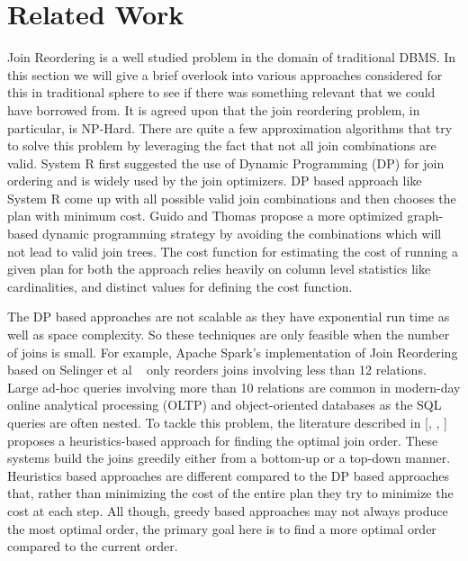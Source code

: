 \section{Related Work}\label{sec:rel_work}
Join Reordering is a well studied problem in the domain of traditional DBMS. In this section we will give a brief overlook into various approaches considered for this in traditional sphere to see if there was something relevant that we could have borrowed from. It is agreed upon that the join reordering problem, in particular, is NP-Hard. There are quite a few approximation algorithms that try to solve this problem by leveraging the fact that not all join combinations are valid. System R \cite{b1} first suggested the use of Dynamic Programming (DP) for join ordering and is widely used by the join optimizers. DP based approach like System R come up with all possible valid join combinations and then chooses the plan with minimum cost. Guido and Thomas \cite{b3} propose a more optimized graph-based dynamic programming strategy by avoiding the combinations which will not lead to valid join trees. The cost function for estimating the cost of running a given plan for both the approach relies heavily on column level statistics like cardinalities, and distinct values for defining the cost function.

The DP based approaches are not scalable as they have exponential run time as well as space complexity. So these techniques are only feasible when the number of joins is small. For example, Apache Spark's implementation of Join Reordering based on Selinger et al ~\cite{b1} only reorders joins involving less than 12 relations. Large ad-hoc queries involving more than 10 relations are common in modern-day online analytical processing (OLTP) and object-oriented databases as the SQL queries are often nested. To tackle this problem,  the literature described in [\cite{b4}, \cite{b5}, \cite{b6}] proposes a heuristics-based approach for finding the optimal join order. These systems build the joins greedily either from a bottom-up or a top-down manner.  Heuristics based approaches are different compared to the DP based approaches that, rather than minimizing the cost of the entire plan they try to minimize the cost at each step. All though, greedy based approaches may not always produce the most optimal order, the primary goal here is to find a more optimal order compared to the current order.

